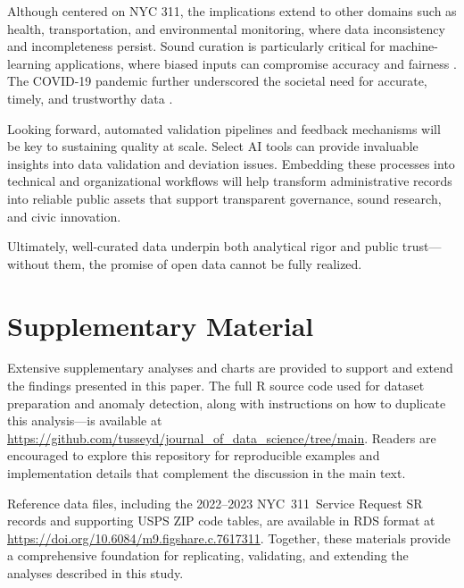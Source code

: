\documentclass[linenumber]{jdsart}
\begin{document}
Although centered on \textsc{NYC 311}, the implications extend to other 
domains such as health, transportation, and environmental monitoring, where 
data inconsistency and incompleteness persist. 
Sound curation is particularly critical for machine-learning applications, 
where biased inputs can compromise accuracy and fairness 
\citep{rahm2000data,geiger2020garbage}. 
The COVID-19 pandemic further underscored the societal need for accurate, 
timely, and trustworthy data 
\citep{worby2020face,khemasuwan2021applications}.

Looking forward, automated validation pipelines and feedback mechanisms will 
be key to sustaining quality at scale. Select AI tools can provide invaluable insights
into data validation and deviation issues. 
Embedding these processes into technical and organizational workflows will 
help transform administrative records into reliable public assets that 
support transparent governance, sound research, and civic innovation.

Ultimately, well-curated data underpin both analytical rigor and public 
trust—without them, the promise of open data cannot be fully realized.



\section*{Supplementary Material}
Extensive supplementary analyses and charts are provided to support 
and extend the findings presented in this paper.  
The full \textsc{R} source code used for dataset preparation and anomaly detection, 
along with instructions on how to duplicate this analysis—is available at
\url{https://github.com/tusseyd/journal_of_data_science/tree/main}.  
Readers are encouraged to explore this repository for reproducible examples 
and implementation details that complement the discussion in the main text.  

Reference data files, including the 2022--2023 NYC~311~Service Request SR 
records and supporting USPS ZIP code tables, are available in RDS format at 
\url{https://doi.org/10.6084/m9.figshare.c.7617311}.  
Together, these materials provide a comprehensive foundation for replicating, 
validating, and extending the analyses described in this study.



\end{document}
